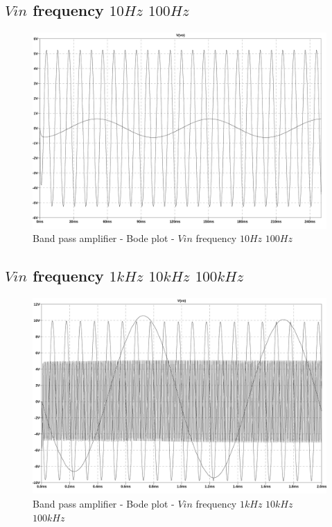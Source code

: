 \documentclass[10pt,a4paper]{book}
\begin{document}
\subsection{$Vin$ frequency $10Hz$ $100Hz$}


\begin{figure}[H]
  \centering
  \includegraphics[width=14cm]{graph/2d4a.jpg}
  \caption{Band pass amplifier - Bode plot - $Vin$ frequency $10Hz$ $100Hz$}
  \label{2d4agraph}
\end{figure}

\subsection{$Vin$ frequency $1kHz$ $10kHz$ $100kHz$}


\begin{figure}[H]
  \centering
  \includegraphics[width=14cm]{graph/2d4b.jpg}
  \caption{Band pass amplifier - Bode plot - $Vin$ frequency $1kHz$ $10kHz$ $100kHz$}
  \label{2d4bgraph}
\end{figure}
\end{document}
